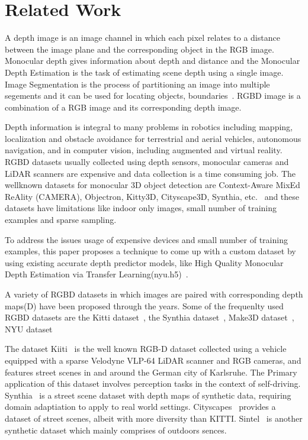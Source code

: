 \documentclass[review]{cvpr}
\begin{document}


\section {Related Work}

A depth image is an image channel in which each pixel relates to a distance between the image plane and the
corresponding object in the RGB image.
Monocular depth gives information about depth and distance and the Monocular Depth Estimation is the task of estimating scene depth 
using a single image\cite{abuolaim2020defocus}. 
Image Segmentation is the process of partitioning an image into multiple segements and it can be used for locating objects, 
boundaries~\cite{amza2012review}. RGBD image is a combination of a RGB image and its corresponding depth image\cite{zhang2018deep}.
 
Depth information is integral to many problems in
robotics including mapping, localization and obstacle avoidance for terrestrial and aerial vehicles, autonomous navigation, 
and in computer vision, including augmented and virtual reality\cite{marchand2015pose}. RGBD datasets usually collected 
using depth sensors, monocular cameras and LiDAR scanners are expensive and data collection is a time consuming job. 
The wellknown datasets for monocular 3D object detection are Context-Aware MixEd ReAlity (CAMERA), Objectron, 
Kitty3D, Cityscape3D, Synthia, etc.~\cite{} and these datasets have 
 limitations like indoor only images, small number of training examples and sparse sampling. 
 
 To address the issues usage of expensive devices and small number of training examples, this paper proposes a 
 technique to come up with a custom dataset by using existing accurate depth predictor models, like High Quality Monocular Depth Estimation 
 via Transfer Learning(nyu.h5)~\cite{alhashim2018high}. 

A variety of RGBD datasets in which images are paired with corresponding depth maps(D) have been proposed through the years.
Some of the frequenlty used RGBD datasets are the Kitti dataset~\cite{geiger2013vision}, the Synthia dataset~\cite{ros2016synthia}, 
Make3D dataset~\cite{saxena2008make3d}, NYU dataset~\cite{silberman2012indoor}

The dataset Kiiti~\cite{geiger2013vision} is the well known RGB-D dataset collected using a vehicle equipped with a sparse 
Velodyne VLP-64 LiDAR scanner and RGB cameras, and features street scenes in and around the German city of Karlsruhe. 
The Primary application of this dataset involves perception tasks in the context of self-driving. 
Synthia~\cite{ros2016synthia} is a street scene dataset with depth maps of synthetic data, 
requiring domain adaptiation to apply to 
real world settings. Cityscapes~\cite{cordts2016cityscapes} provides a dataset of street scenes, 
albeit with more diversity than KITTI. 
Sintel~\cite{mayer2016large} is another synthetic dataset which mainly comprises of outdoors sences.
\end{document}

